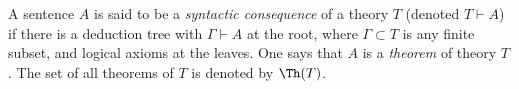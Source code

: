 \begin{dfn}
A sentence $A$ is said to be a \emph{syntactic consequence} of a theory $T$ (denoted $T \vdash A$) if
there is a deduction tree with $\Gamma \vdash A$ at the root, where $\Gamma \subset T$ is any finite subset, and logical axioms at the leaves.
One says that $A$ is a \emph{theorem} of theory $T$.
The set of all theorems of $T$ is denoted by $\Th(T)$.
\end{dfn}